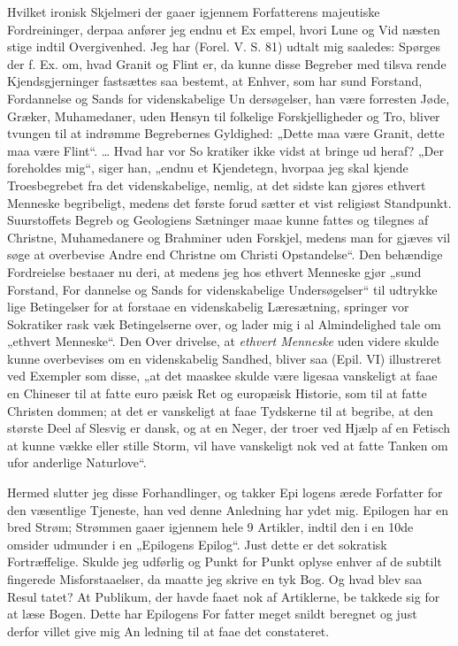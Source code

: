 \documentclass[12pt]{book}
\newcommand{\opage}[1]{\marginnote{\footnotesize\textit{[#1]}}}
\begin{document}
Hvilket ironisk Skjelmeri der gaaer igjennem Forfatterens
majeutiske Fordreininger, derpaa anfører jeg endnu et Ex\-%
empel, hvori Lune og Vid næsten stige indtil Overgivenhed.
Jeg har (Forel. V. S. 81) udtalt mig saaledes: Spørges der f. Ex.
om, hvad Granit og Flint er, da kunne disse Begreber med tilsva\-%
rende Kjendsgjerninger fastsættes saa bestemt, at Enhver, som har
\opage{322}\setcounter{footnote}{0}%
sund Forstand, Fordannelse og Sands for videnskabelige Un\-%
dersøgelser, han være forresten Jøde, Græker, Muhamedaner,
uden Hensyn til folkelige Forskjelligheder og Tro, bliver
tvungen til at indrømme Begrebernes Gyldighed: „Dette maa
være Granit, dette maa være Flint“. \ldots{} Hvad har vor So\-%
kratiker ikke vidst at bringe ud heraf? „Der foreholdes mig“,
siger han, „endnu et Kjendetegn, hvorpaa jeg skal kjende
Troesbegrebet fra det videnskabelige, nemlig, at det sidste kan
gjøres ethvert Menneske begribeligt, medens det første forud\-%
sætter et vist religiøst Standpunkt. Suurstoffets Begreb og
Geologiens Sætninger maae kunne fattes og tilegnes af Christne,
Muhamedanere og Brahminer uden Forskjel, medens man for\-%
gjæves vil søge at overbevise Andre end Christne om Christi
Opstandelse“. Den behændige Fordreielse bestaaer nu deri,
at medens jeg hos ethvert Menneske gjør „sund Forstand, For\-%
dannelse og Sands for videnskabelige Undersøgelser“ til udtrykke\-%
lige Betingelser for at forstaae en videnskabelig Læresætning,
springer vor Sokratiker rask væk Betingelserne over, og lader mig
i al Almindelighed tale om „ethvert Menneske“. Den Over\-%
drivelse, at \emph{ethvert Menneske} uden videre skulde kunne
overbevises om en videnskabelig Sandhed, bliver saa (Epil.
VI) illustreret ved Exempler som disse, „at det maaskee skulde
være ligesaa vanskeligt at faae en Chineser til at fatte euro\-%
pæisk Ret og europæisk Historie, som til at fatte Christen\-%
dommen; at det er vanskeligt at faae Tydskerne til at begribe,
at den største Deel af Slesvig er dansk, og at en Neger, der
troer ved Hjælp af en Fetisch at kunne vække eller stille
Storm, vil have vanskeligt nok ved at fatte Tanken om ufor\-%
anderlige Naturlove“.

Hermed slutter jeg disse Forhandlinger, og takker Epi\-%
logens ærede Forfatter for den væsentlige Tjeneste, han ved
denne Anledning har ydet mig. Epilogen har en bred Strøm;
Strømmen gaaer igjennem hele 9 Artikler, indtil den i en
\opage{323}\setcounter{footnote}{0}%
10de omsider udmunder i en „Epilogens Epilog“. Just dette
er det sokratisk Fortræffelige. Skulde jeg udførlig og Punkt
for Punkt oplyse enhver af de subtilt fingerede Misforstaaelser,
da maatte jeg skrive en tyk Bog. Og hvad blev saa Resul\-%
tatet? At Publikum, der havde faaet nok af Artiklerne, be\-%
takkede sig for at læse Bogen. Dette har Epilogens For\-%
fatter meget snildt beregnet og just derfor villet give mig An\-%
ledning til at faae det constateret.
\end{document}
